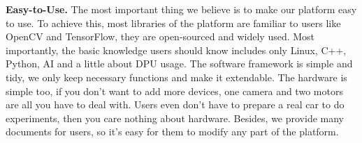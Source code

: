 \textbf{Easy-to-Use. }The most important thing we believe is to make our platform easy to use. To achieve this, most libraries of the platform are familiar to users like OpenCV and TensorFlow\cite{tensorflow}, they are open-sourced and widely used. Most importantly, the basic knowledge users should know includes only Linux, C++, Python, AI and a little about DPU usage. The software framework is simple and tidy, we only keep necessary functions and make it extendable. The hardware is simple too, if you don't want to add more devices, one camera and two motors are all you have to deal with. Users even don't have to prepare a real car to do experiments, then you care nothing about hardware. Besides, we provide many documents for users, so it's easy for them to modify any part of the platform.